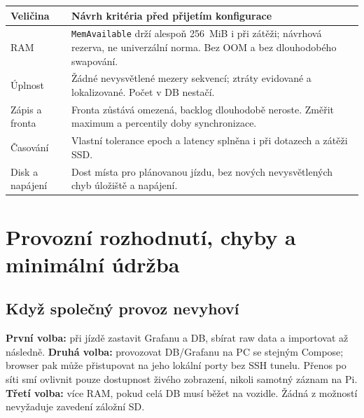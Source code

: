 \documentclass[11pt,a4paper]{article}
\begin{document}
\par\noindent\begin{tabularx}{\textwidth}{L{44mm}Y}
\toprule Veličina & Návrh kritéria před přijetím konfigurace\\\midrule
RAM & \texttt{MemAvailable} drží alespoň 256~MiB i při zátěži; návrhová rezerva, ne univerzální norma. Bez OOM a bez dlouhodobého swapování.\\\addlinespace
Úplnost & Žádné nevysvětlené mezery sekvencí; ztráty evidované a lokalizované. Počet v DB nestačí.\\\addlinespace
Zápis a fronta & Fronta zůstává omezená, backlog dlouhodobě neroste. Změřit maximum a percentily doby synchronizace.\\\addlinespace
Časování & Vlastní tolerance epoch a latency splněna i při dotazech a zátěži SSD.\\\addlinespace
Disk a napájení & Dost místa pro plánovanou jízdu, bez nových nevysvětlených chyb úložiště a napájení.\\
\bottomrule\end{tabularx}\par

\clearpage
\section{Provozní rozhodnutí, chyby a minimální údržba}
\subsection{Když společný provoz nevyhoví}
\textbf{První volba:} při jízdě zastavit Grafanu a DB, sbírat raw data a importovat až následně. \textbf{Druhá volba:} provozovat DB/Grafanu na PC se stejným Compose; browser pak může přistupovat na jeho lokální porty bez SSH tunelu. Přenos po síti smí ovlivnit pouze dostupnost živého zobrazení, nikoli samotný záznam na Pi. \textbf{Třetí volba:} více RAM, pokud celá DB musí běžet na vozidle. Žádná z možností nevyžaduje zavedení záložní SD.
\end{document}
